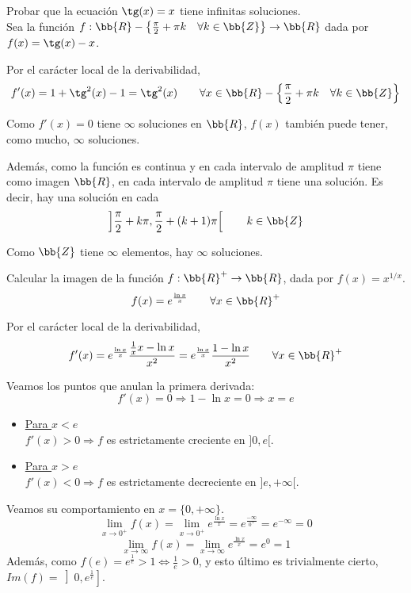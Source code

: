\begin{ejercicio}
    Probar que la ecuación $\tg(x) = x$ tiene infinitas soluciones.\\

    Sea la función $f:\bb{R}-\left\{\frac{\pi}{2}+\pi k \quad \forall k \in \bb{Z}\right\} \to \bb{R}$ dada por $f(x)=\tg(x)-x$.

    Por el carácter local de la derivabilidad,
    $$ f'(x)=1+\tg^2(x) - 1 = \tg^2(x) \qquad \forall x \in \bb{R}-\left\{\frac{\pi}{2}+\pi k \quad \forall k \in \bb{Z}\right\}$$

    Como $f'(x)=0$ tiene $\infty$ soluciones en $\bb{R}$, $f(x)$ también puede tener, como mucho, $\infty$ soluciones.
    
    Además, como la función es continua y en cada intervalo de amplitud $\pi$ tiene como imagen $\bb{R}$, en cada intervalo de amplitud $\pi$ tiene una solución. Es decir, hay una solución en cada
    $$\left] \frac{\pi}{2}+k\pi,\frac{\pi}{2}+(k+1)\pi \right[\qquad k\in \bb{Z}$$

    Como $\bb{Z}$ tiene $\infty$ elementos, hay $\infty$ soluciones.
\end{ejercicio}

\begin{ejercicio}
    Calcular la imagen de la función $f:\bb{R}^+ \to \bb{R}$, dada por $f(x)=x^{1/x}$.
    $$f(x)=e^{\frac{\ln{x}}{x}} \qquad \forall x\in \bb{R}^+$$

    Por el carácter local de la derivabilidad, $$f'(x)=e^{\frac{\ln{x}}{x}} \frac{\frac{1}{x}x-\ln{x}}{x^2} = e^{\frac{\ln{x}}{x}} \frac{1-\ln{x}}{x^2} \qquad \forall x \in \bb{R}^+$$

    Veamos los puntos que anulan la primera derivada:
    $$f'(x)=0 \Longrightarrow 1-\ln{x}=0 \Longrightarrow x=e$$
    \begin{itemize}
        \item \underline{Para $x<e$}\\
        $f'(x)>0 \Longrightarrow f$ es estrictamente creciente en $]0,e[$.

        \item \underline{Para $x>e$}\\
        $f'(x)<0 \Longrightarrow f$ es estrictamente decreciente en $]e, +\infty[$.

    \end{itemize}
    
    Veamos su comportamiento en $x=\{0,+\infty\}$.
    \begin{equation*}
        \lim_{x\to0^+}f(x) = \lim_{x\to0^+} e^{\frac{\ln{x}}{x}} = e^\frac{-\infty}{0^+} = e^{-\infty} = 0
    \end{equation*}
    \begin{equation*}
        \lim_{x\to\infty}f(x) = \lim_{x\to\infty} e^{\frac{\ln{x}}{x}} = e^0 = 1
    \end{equation*}
    Además, como $f(e)=e^\frac{1}{e}>1 \Longleftrightarrow \frac{1}{e} > 0$, y esto último es trivialmente cierto, $Im(f)=\left]0,e^\frac{1}{e}\right]$.
\end{ejercicio}

